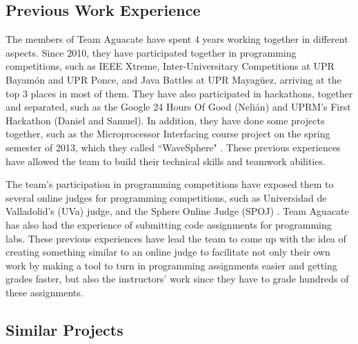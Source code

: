 
\subsection{Previous Work Experience}

The members of Team Aguacate have spent 4 years working together in different aspects. Since 2010, they have participated together in programming
competitions, such as IEEE Xtreme, Inter-Universitary Competitions at UPR Bayamón and UPR Ponce, and Java Battles at UPR Mayagüez, arriving at the top 3 places in most of them. They have also participated in hackathons, together and separated, such as the Google 24 Hours Of Good (Nelián) and UPRM's First Hackathon (Daniel and Samuel). In addition, they have done some projects together, such as the Microprocessor Interfacing
course project on the spring semester of 2013, which they called ``WaveSphere"
\cite{Micro2}. These previous experiences have allowed the team to build their
technical skills and teamwork abilities.

The team's participation in programming competitions have exposed them to
several  online judges for programming competitions, such as Universidad de
Valladolid's (UVa) judge, \cite{UVA} and the Sphere Online Judge (SPOJ)
\cite{SPOJ}. Team Aguacate has also had the experience of submitting code
assignments for programming labs. These previous experiences have lead the team
to come up with the idea of creating something similar to an online judge to
facilitate not only their own work by making a tool to turn in programming
assignments easier and getting grades faster, but also the instructors' work
since they have to grade hundreds of these assignments.

\subsection{Similar Projects}

